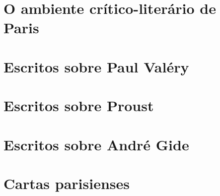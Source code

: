 

\part{O ambiente crítico-literário de Paris}




\part{Escritos sobre Paul Valéry}



\part{Escritos sobre Proust}


\part{Escritos sobre André Gide}




\part{Cartas parisienses}



